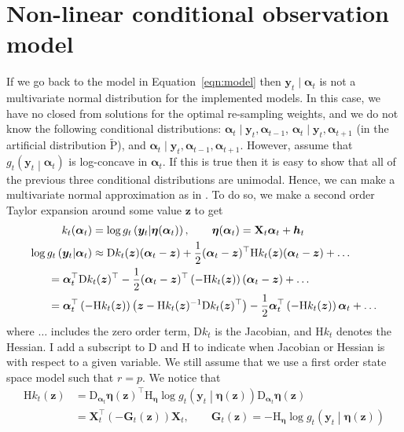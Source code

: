 \documentclass[notitlepage]{article}
\renewcommand{\vec}[1]{\bm{#1}}
\newcommand{\mat}[1]{\mathbf{#1}}
\newcommand{\Lparen}[1]{\left( #1\right)}
\newcommand{\Cond}[2]{ #1 \middle\vert  #2}
\newcommand{\Prob}{\text{P}}
\newcommand{\optor}[2]{#1\Lparen{#2}}
\newcommand{\optorC}[3]{\optor{#1}{\Cond{#2}{#3}}}
\newcommand{\dimState}{p}
\newcommand{\dimRng}{r}
\newcommand\Jaco{\mathrm D}
\newcommand\Hess{\mathrm H}
\begin{document}
\section{Non-linear conditional observation model}\label{sec:NonLinObs}
If we go back to the model in Equation~\eqref{eqn:model} then $\vec y_t
\mid \vec\alpha_t$ is not a multivariate normal distribution for the 
implemented models.   
In this case, we have no closed from solutions
for the optimal re-sampling weights, and we do not know the following conditional 
distributions: $\vec\alpha_t \mid \vec y_t, \vec\alpha_{t-1}$, 
$\vec\alpha_t \mid \vec y_t, \vec\alpha_{t+1}$ (in the artificial 
distribution $\widetilde{\Prob}$), and 
$\vec\alpha_t \mid \vec y_t, \vec\alpha_{t-1}, \vec\alpha_{t+1}$. 
However, assume that $\optorC{g_t}{\vec{y}_t}{\vec{\alpha}_t}$ 
is log-concave in $\vec{\alpha}_t$. If this is true then it is easy 
to show that all of the previous three conditional distributions are 
unimodal. Hence, we can make a multivariate normal approximation as in \cite{pitt99}. To do so, we
 make a second order Taylor expansion around some value $\vec z$ 
to get%
%
\begin{align*}
k_t(\vec\alpha_t) &= \log\optorC{g_t}{\vec y_t}{\vec\eta(\vec\alpha_t)}, 
	\qquad \vec\eta(\vec\alpha_t) = \mat{X}_t\vec{\alpha}_t + \vec h_t \\
\log\optorC{g_t}{\vec{y}_t}{\vec\alpha_t}&\approx
	\Jaco k_t(\vec z) (\vec\alpha_t - \vec z) 
	+  \frac 12(\vec\alpha_t - \vec z)^\top
	\Hess k_t(\vec z)
	(\vec\alpha_t - \vec z) + \dots \\
&\hspace{-40pt}= \vec\alpha_t^\top \Jaco k_t(\vec z)^\top -
	\frac 12(\vec\alpha_t - \vec z)^\top
	\Lparen{-\Hess k_t(\vec z)}
	(\vec\alpha_t - \vec z) + \dots \\
&\hspace{-40pt}= \vec\alpha_t^\top\Lparen{-\Hess k_t(\vec z)}\Lparen{
	\vec z - \Hess k_t(\vec z)^{-1}\Jaco k_t(\vec z)^\top} 
	- \frac 12 \vec\alpha_t^\top\Lparen{-\Hess k_t(\vec z)}\vec\alpha_t + \dots
\end{align*}%
%
where $\dots$ includes the zero order term, $\Jaco k_t$ is the Jacobian,
and $\Hess k_t$ denotes the Hessian. I add a subscript to $\Jaco$ and $\Hess$
to indicate when Jacobian or Hessian is with respect to a given variable.
We still assume that we use a first 
order state space model such that $\dimRng = \dimState$. We notice that %
%
\begin{align*}
\Hess k_t(\vec z) &= 
	\Jaco_{\vec\alpha_t}\vec\eta(\vec z)^\top
	\Hess_{\vec\eta}\log\optorC{g_t}{\vec y_t}{\vec\eta(\vec z)}
	\Jaco_{\vec\alpha_t}\vec\eta(\vec z) \\
	&=\mat X_t^\top(-\mat G_t(\vec z))\mat X_t, \qquad 
	\mat G_t(\vec z) = -\Hess_{\vec\eta}\log\optorC{g_t}{\vec y_t}{\vec\eta(\vec z)}
\end{align*}%
\end{document}
